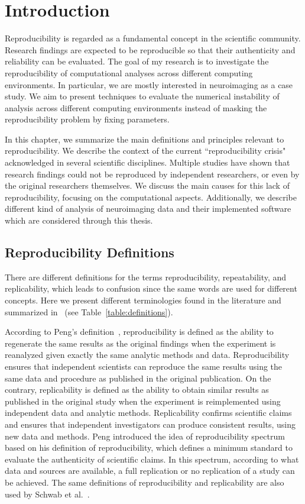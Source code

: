 \chapter{Introduction}
\label{ch:intro}

Reproducibility is regarded as a fundamental concept in the scientific 
community. Research findings are expected to be reproducible so that 
their authenticity and reliability can be evaluated. The goal of my 
research is to investigate the reproducibility of computational analyses across different 
computing environments. In particular, we are mostly interested in 
neuroimaging as a case study. We aim to present techniques to evaluate 
the numerical instability of analysis across different computing environments 
instead of masking the reproducibility problem by fixing parameters.

In this chapter, we summarize the main definitions and 
principles relevant to reproducibility. We describe the context of the 
current ``reproducibility crisis" acknowledged in several scientific 
disciplines. Multiple studies have shown that research findings could 
not be reproduced by independent researchers, or even by the original 
researchers themselves. We discuss the main causes for this lack of 
reproducibility, focusing on the computational aspects. 
Additionally, we describe different kind of analysis of 
neuroimaging data and their implemented software which are considered 
through this thesis. 


\section{Reproducibility Definitions}

There are different definitions for the terms reproducibility, 
repeatability, and replicability, which leads to confusion since the 
same words are used for different concepts. Here we present different 
terminologies found in the literature and summarized 
in~\cite{plesser2018reproducibility} (see 
Table~\ref{table:definitions}).
 
According to Peng's definition~\cite{peng2011reproducible}, 
reproducibility is defined as the ability to regenerate the same 
results as the original findings when the experiment is reanalyzed 
given exactly the same analytic methods and data. Reproducibility 
ensures that independent scientists can reproduce the same results 
using the same data and procedure as published in the original 
publication. On the contrary, replicability is defined as the ability 
to obtain similar results as published in the original study when 
the experiment is reimplemented using independent data and analytic 
methods. Replicability confirms scientific claims and ensures that 
independent investigators can produce consistent results, using new 
data and methods. Peng introduced the idea of reproducibility 
spectrum based on his definition of reproducibility, which defines a 
minimum standard to evaluate the authenticity of scientific claims. 
In this spectrum, according to what data and sources are available, a 
full replication or no replication of a study can be achieved. 
The same definitions of reproducibility and replicability 
are also used by Schwab et al.~\cite{schwab2000making}.

